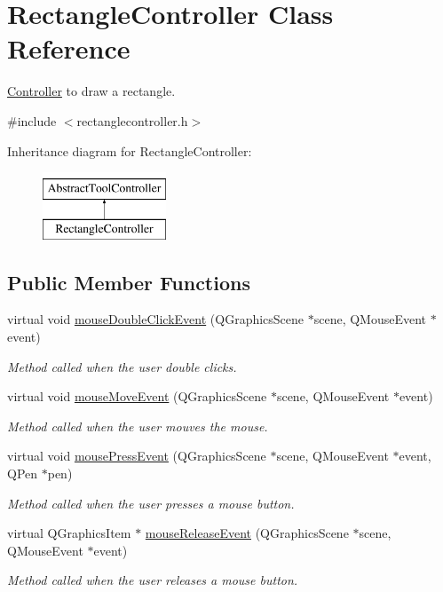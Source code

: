 \hypertarget{classRectangleController}{}\section{Rectangle\+Controller Class Reference}
\label{classRectangleController}


\hyperlink{classController}{Controller} to draw a rectangle.  




{\ttfamily \#include $<$rectanglecontroller.\+h$>$}

Inheritance diagram for Rectangle\+Controller\+:\begin{figure}[H]
\begin{center}
\leavevmode
\includegraphics[height=2.000000cm]{classRectangleController}
\end{center}
\end{figure}
\subsection*{Public Member Functions}
\begin{DoxyCompactItemize}
\item 
virtual void \hyperlink{classRectangleController_a706b3621b5437b4a39eafb698b8cda0f}{mouse\+Double\+Click\+Event} (Q\+Graphics\+Scene $\ast$scene, Q\+Mouse\+Event $\ast$event)
\begin{DoxyCompactList}\small\item\em Method called when the user double clicks. \end{DoxyCompactList}\item 
virtual void \hyperlink{classRectangleController_aa593bd4a91f89f982185ac59b3a26e0d}{mouse\+Move\+Event} (Q\+Graphics\+Scene $\ast$scene, Q\+Mouse\+Event $\ast$event)
\begin{DoxyCompactList}\small\item\em Method called when the user mouves the mouse. \end{DoxyCompactList}\item 
virtual void \hyperlink{classRectangleController_aead56e4a6249e8fba020cbacb03c0d85}{mouse\+Press\+Event} (Q\+Graphics\+Scene $\ast$scene, Q\+Mouse\+Event $\ast$event, Q\+Pen $\ast$pen)
\begin{DoxyCompactList}\small\item\em Method called when the user presses a mouse button. \end{DoxyCompactList}\item 
virtual Q\+Graphics\+Item $\ast$ \hyperlink{classRectangleController_a61a472851c5a79c64d955bdd4f3799aa}{mouse\+Release\+Event} (Q\+Graphics\+Scene $\ast$scene, Q\+Mouse\+Event $\ast$event)
\begin{DoxyCompactList}\small\item\em Method called when the user releases a mouse button. \end{DoxyCompactList}\end{DoxyCompactItemize}
